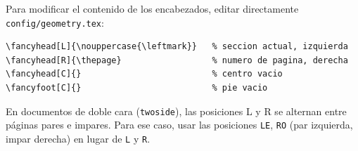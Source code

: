 Para modificar el contenido de los encabezados, editar directamente
\texttt{config/geometry.tex}:

\begin{lstlisting}[style=latex, frame=none, numbers=none]
\fancyhead[L]{\nouppercase{\leftmark}}   % seccion actual, izquierda
\fancyhead[R]{\thepage}                  % numero de pagina, derecha
\fancyhead[C]{}                          % centro vacio
\fancyfoot[C]{}                          % pie vacio
\end{lstlisting}

En documentos de doble cara (\texttt{twoside}), las posiciones L y R se
alternan entre páginas pares e impares. Para ese caso, usar las posiciones
\texttt{LE}, \texttt{RO} (par izquierda, impar derecha) en lugar de
\texttt{L} y \texttt{R}.

\printbibliography[heading=subbibliography]
